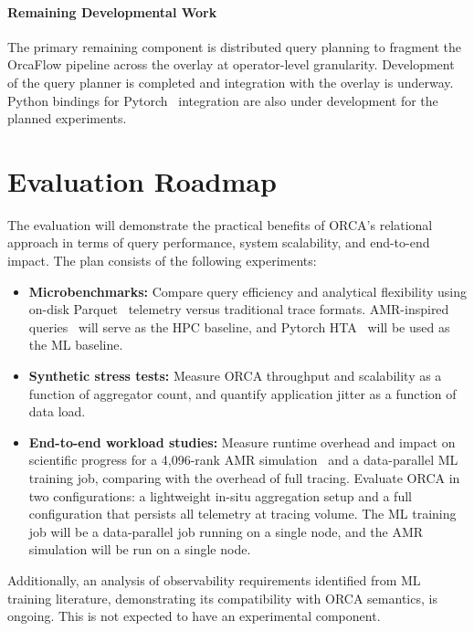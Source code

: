 \paragraph{Remaining Developmental Work}
The primary remaining component is distributed query planning to fragment the OrcaFlow pipeline
across the overlay at operator-level granularity.
Development of the query planner is completed and integration with the overlay is underway.
Python bindings for Pytorch~\cite{Paszk2019:PyTorch} integration are also under development for the
planned experiments.

\section{Evaluation Roadmap}

The evaluation will demonstrate the practical benefits of ORCA's relational approach in terms of
query performance, system scalability, and end-to-end impact.
The plan consists of the following experiments:

\begin{itemize}
  \item \textbf{Microbenchmarks:}
        Compare query efficiency and analytical flexibility using on-disk Parquet~\cite{:Parquet} telemetry
        versus traditional trace formats.
        AMR-inspired queries~\cite{Jain2025:AMR} will serve as the HPC baseline, and Pytorch
        HTA~\cite{:HolisticTraceAnalysis} will be used as the ML baseline.
  \item \textbf{Synthetic stress tests:}
        Measure ORCA throughput and scalability as a function of aggregator count, and quantify application
        jitter as a function of data load.
  \item \textbf{End-to-end workload studies:}
        Measure runtime overhead and impact on scientific progress for a 4,096-rank AMR
        simulation~\cite{Jain2025:AMR} and a data-parallel ML training job, comparing with the overhead of
        full tracing.
        Evaluate ORCA in two configurations: a lightweight in-situ aggregation setup and a full
        configuration that persists all telemetry at tracing volume.
        The ML training job will be a data-parallel job running on a single node, and the AMR simulation
        will be run on a single node.
\end{itemize}

Additionally, an analysis of observability requirements identified from ML training literature,
demonstrating its compatibility with ORCA semantics, is ongoing.
This is not expected to have an experimental component.


